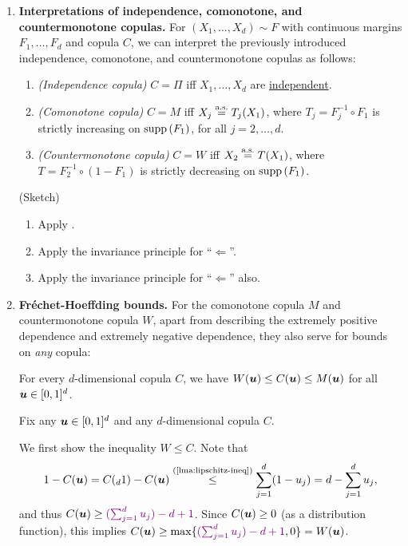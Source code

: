 \begin{enumerate}
\item\label{it:indp-comono-countermono-cop-interpret} \textbf{Interpretations
of independence, comonotone, and countermonotone copulas.} For
\((X_1,\dotsc,X_d)\sim F\) with continuous margins \(F_1,\dotsc,F_d\) and
copula \(C\), we can interpret the previously introduced independence,
comonotone, and countermonotone copulas as follows:
\begin{enumerate}
\item \emph{(Independence copula)} \(C=\Pi\) iff \(X_1,\dotsc,X_d\) are
\underline{independent}.
\item \emph{(Comonotone copula)} \(C=M\) iff \(X_j\overset{\text{a.s.}}= T_j(X_1)\), where
\(T_j=F_j^{-1}\circ F_1\) is strictly increasing on \(\operatorname{supp}\left(F_1\right)\), for all
\(j=2,\dotsc,d\).
\item \emph{(Countermonotone copula)} \(C=W\) iff \(X_2\overset{\text{a.s.}}= T(X_1)\), where
\(T=F_2^{-1}\circ (1-F_1)\) is strictly decreasing on \(\operatorname{supp}\left(F_1\right)\).
\end{enumerate}
\begin{pf}
(Sketch)
\begin{enumerate}
\item Apply .
\item Apply the invariance principle for ``\(\Leftarrow\)''.
\item Apply the invariance principle for ``\(\Leftarrow\)'' also.
\end{enumerate}
\end{pf}
\item \textbf{Fr\'echet-Hoeffding bounds.} For the comonotone copula \(M\) and
countermonotone copula \(W\), apart from describing the extremely positive
dependence and extremely negative dependence, they also serve for bounds on
\emph{any} copula:
\begin{theorem}
\label{thm:frechet-hoeffding-bounds}
For every \(d\)-dimensional copula \(C\), we have \(W(\bm{u})\le
C(\bm{u})\le M(\bm{u})\) for all \(\bm{u}\in[0,1]^{d}\).
\end{theorem}
\begin{pf}
Fix any \(\bm{u}\in[0,1]^{d}\) and any \(d\)-dimensional copula \(C\).

We first show the inequality \(W\le C\). Note that
\[
1-C(\vect{u})=C({}_{d}1)-C(\vect{u})\overset{\text{(\Cref{lma:lipschitz-ineq})}}{\le}
\sum_{j=1}^{d}(1-u_j)=d-\sum_{j=1}^{d}u_j,
\]
and thus \(C(\vect{u})\ge \vc{(\sum_{j=1}^{d}u_j)-d+1}\). Since
\(C(\bm{u})\ge 0\) (as a distribution function), this implies
\(C(\vect{u})\ge \max\{\vc{(\sum_{j=1}^{d}u_j)-d+1},0\}=W(\vect{u})\).


\end{pf}
\end{enumerate}
